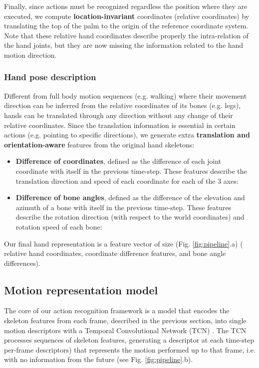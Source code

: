\documentclass[letterpaper, 10 pt, conference]{ieeeconf}
\begin{document}
Finally, since actions must be recognized regardless the position where they are executed, we compute \textbf{location-invariant} coordinates (relative coordinates) by translating the top of the palm to the origin of the reference coordinate system. Note that these relative hand coordinates describe properly the intra-relation of the hand joints, but they are now missing the information related to the hand motion direction.


\subsubsection{Hand pose description}

Different from full body motion sequences (e.g. walking) where their movement direction can be inferred from the relative coordinates of its bones (e.g. legs), hands can be translated through any direction without any change of their relative coordinates. Since the translation information is essential in certain actions (e.g. pointing to specific directions), we generate extra \textbf{translation and orientation-aware} features from the original hand skeletons:
\begin{itemize}
    \item \textbf{Difference of coordinates}, defined as the difference of each joint coordinate with itself in the previous time-step. These features describe the translation direction and speed of each coordinate for each of the 3 axes:
        
    \item \textbf{Difference of bone angles}, defined as the difference of the elevation  and azimuth  of a bone  with itself in the previous time-step. These features describe the rotation direction (with respect to the world coordinates) and rotation speed of each bone:
        
        
\end{itemize}

Our final hand representation is a feature vector of size  (Fig. \ref{fig:pipeline}.a) ( relative hand coordinates,  coordinate difference features, and  bone angle differences).



\subsection{Motion representation model}\label{sec:tcn}

The core of our action recognition framework is a model that encodes the skeleton features from each frame, described in the previous section, into single motion descriptors with a Temporal Convolutional Network (TCN) \cite{bai2018empirical, oord2016wavenet}. 
The TCN processes sequences of skeleton features, generating a descriptor at each time-step per-frame descriptors) that represents the motion performed up to that frame, i.e. with no information from the future (see Fig. \ref{fig:pipeline}.b).
\end{document}
